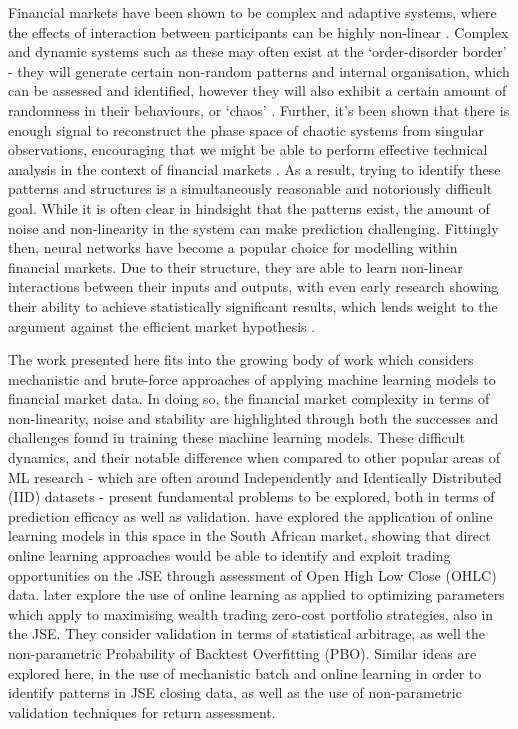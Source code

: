 \documentclass[a4paper,11pt,oneside]{article}
\theoremstyle{plain}
\theoremstyle{definition}
\begin{document}
	Financial markets have been shown to be complex and adaptive systems, where the effects of interaction 
	between participants can be highly non-linear \citep{Arthur}. Complex and dynamic systems such as these may 
	often exist at the `order-disorder border' - they will generate certain non-random patterns and internal organisation, 
	which can be assessed and identified, however they will also exhibit a certain amount of randomness in their behaviours, 
	or `chaos' \citep{Crutchfield}. Further, it's been shown that there is enough signal to reconstruct 
	the phase space of chaotic systems from singular observations, encouraging that we might be able to perform 
	effective technical analysis in the context of financial markets \citep{Packard, Takens}. As a result, trying to identify these patterns and structures is a simultaneously 
	reasonable and notoriously difficult goal. While it is often clear in hindsight that the patterns exist, the amount of 
	noise and non-linearity in the system can make prediction challenging.
	Fittingly then, neural networks have become a popular choice for modelling within financial markets. Due to 
	their structure, they are able to learn non-linear interactions between their inputs and outputs, with even early research 
	showing their ability to achieve statistically significant results, which lends weight to the 
	argument against the efficient market hypothesis \citep{Skabar}. 
	\hfill \break
	
	The work presented here fits into the growing body of work which considers mechanistic and brute-force approaches of applying 
	machine learning models to financial market data. In doing so, the financial market complexity in terms of non-linearity, noise and stability are highlighted through 
	both the successes and challenges found in training these machine learning models. These difficult dynamics, and their notable difference when 
	compared to other popular areas of ML research - which are often around Independently and Identically Distributed (IID) datasets - present fundamental problems to be explored, both 
	in terms of prediction efficacy as well as validation. \citet{Loonat} have explored the application of online learning models in this space
	 in the South African market, showing that direct online learning approaches would be able to identify and exploit trading opportunities on the JSE through assessment 
	 of Open High Low Close (OHLC) data. \citet{MurphyGebbie} later explore the use of online learning as applied to optimizing parameters which apply to maximising wealth trading zero-cost portfolio strategies, also in the JSE. They consider validation in terms of statistical arbitrage, as well the non-parametric Probability of Backtest Overfitting (PBO). Similar ideas are explored here, in the use of mechanistic batch and online learning in order to identify patterns in JSE closing data, as well as the use of non-parametric validation techniques for return assessment.
	
\end{document}

